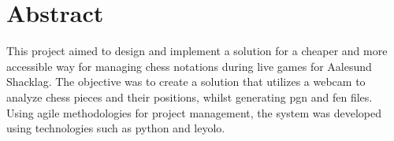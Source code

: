 \chapter*{Abstract}

This project aimed to design and implement a solution for a cheaper and more accessible way for managing chess notations during live games for Aalesund Shacklag. The objective was to create a solution that utilizes a webcam to analyze chess pieces and their positions, whilst generating \gls{pgn} and \gls{fen} files.\\

Using \Gls{agile} methodologies for project management, the system was developed using technologies such as \Gls{python} and \gls{leyolo}. 